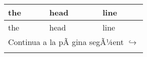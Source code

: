 
\renewcommand{\tablename}{Taula}
\begin{longtable}{|X|X|X|}

\label{fran}\\      %

\hline the & head& line\\ \hline \endfirsthead
\hline the & head& line\\ \hline \endhead

\hline \multicolumn{3}{|r|}{\scriptsize{Continua a la pÃ gina segÃ¼ent $\hookrightarrow$}}\\ \hline \endfoot
\hline \endlastfoot


\end{longtable}
